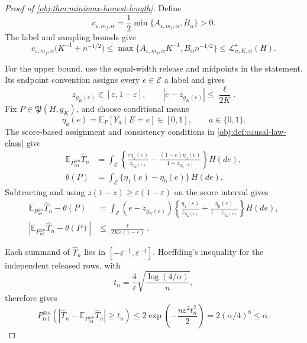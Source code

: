 \begin{proof}[Proof of \cref{obj:thm:minimax-honest-length}]
Define
\[
c_{\varepsilon,m_f,\alpha}
=\frac12\min\{A_{\varepsilon,m_f,\alpha},B_\alpha\}>0.
\]
The label and sampling bounds give
\[
c_{\varepsilon,m_f,\alpha}
\bigl(K^{-1}+n^{-1/2}\bigr)
\leq
\max\{A_{\varepsilon,m_f,\alpha}K^{-1},
      B_\alpha n^{-1/2}\}
\leq\mathcal L^\star_{n,K,\alpha}(H).
\]

For the upper bound, use the equal-width release and midpoints in the statement. Its endpoint convention assigns every \(e\in\mathcal E\) a label and gives
\[
z_{g_K(e)}\in[\varepsilon,1-\varepsilon],
\qquad |e-z_{g_K(e)}|\leq\frac{\ell}{2K}.
\]
Fix \(P\in\mathfrak P(H,g_K)\), and choose conditional means
\[
\eta_a(e)=\mathbb E_P[Y_a\mid E=e]\in[0,1],
\qquad a\in\{0,1\}.
\]
The score-based assignment and consistency conditions in \cref{obj:def:causal-law-class} give
\[
\begin{aligned}
\mathbb E_{P_{\mathrm{rel}}^{\otimes n}}\widehat T_n
&=\int_{\mathcal E}
 \left\{\frac{e\eta_1(e)}{z_{g_K(e)}}
 -\frac{(1-e)\eta_0(e)}{1-z_{g_K(e)}}\right\}H(de),\\
\theta(P)&=\int_{\mathcal E}\{\eta_1(e)-\eta_0(e)\}\,H(de).
\end{aligned}
\]
Subtracting and using \(z(1-z)\geq\varepsilon(1-\varepsilon)\) on the score interval gives
\[
\begin{aligned}
\mathbb E_{P_{\mathrm{rel}}^{\otimes n}}\widehat T_n-\theta(P)
&=\int_{\mathcal E}(e-z_{g_K(e)})
 \left\{\frac{\eta_1(e)}{z_{g_K(e)}}
       +\frac{\eta_0(e)}{1-z_{g_K(e)}}\right\}H(de),\\
\left|\mathbb E_{P_{\mathrm{rel}}^{\otimes n}}\widehat T_n-\theta(P)\right|
&\leq\frac{\ell}{2K\varepsilon(1-\varepsilon)}.
\end{aligned}
\]

Each summand of \(\widehat T_n\) lies in \([-\varepsilon^{-1},\varepsilon^{-1}]\). Hoeffding’s inequality for the independent released rows, with
\[
t_n=\frac4\varepsilon\sqrt{\frac{\log(4/\alpha)}n},
\]
therefore gives
\[
P_{\mathrm{rel}}^{\otimes n}
 \left(\left|\widehat T_n-
 \mathbb E_{P_{\mathrm{rel}}^{\otimes n}}\widehat T_n\right|\geq t_n\right)
\leq 2\exp\!\left(-\frac{n\varepsilon^2t_n^2}{2}\right)
=2(\alpha/4)^8\leq\alpha.
\]


\end{proof}
